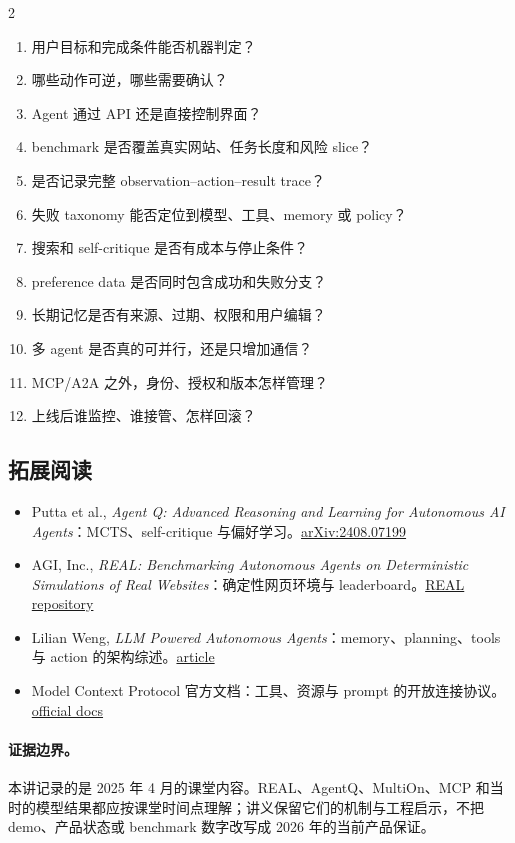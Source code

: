 \documentclass[a4paper]{article}
\begin{document}
\begin{multicols}{2}
\small
\begin{enumerate}
  \item 用户目标和完成条件能否机器判定？
  \item 哪些动作可逆，哪些需要确认？
  \item Agent 通过 API 还是直接控制界面？
  \item benchmark 是否覆盖真实网站、任务长度和风险 slice？
  \item 是否记录完整 observation--action--result trace？
  \item 失败 taxonomy 能否定位到模型、工具、memory 或 policy？
  \item 搜索和 self-critique 是否有成本与停止条件？
  \item preference data 是否同时包含成功和失败分支？
  \item 长期记忆是否有来源、过期、权限和用户编辑？
  \item 多 agent 是否真的可并行，还是只增加通信？
  \item MCP/A2A 之外，身份、授权和版本怎样管理？
  \item 上线后谁监控、谁接管、怎样回滚？
\end{enumerate}
\normalsize
\end{multicols}

\subsection{拓展阅读}

\begin{itemize}
  \item Putta et al., \emph{Agent Q: Advanced Reasoning and Learning for Autonomous AI Agents}：MCTS、self-critique 与偏好学习。\href{https://arxiv.org/abs/2408.07199}{arXiv:2408.07199}
  \item AGI, Inc., \emph{REAL: Benchmarking Autonomous Agents on Deterministic Simulations of Real Websites}：确定性网页环境与 leaderboard。\href{https://github.com/agi-inc/real}{REAL repository}
  \item Lilian Weng, \emph{LLM Powered Autonomous Agents}：memory、planning、tools 与 action 的架构综述。\href{https://lilianweng.github.io/posts/2023-06-23-agent/}{article}
  \item Model Context Protocol 官方文档：工具、资源与 prompt 的开放连接协议。\href{https://modelcontextprotocol.io/}{official docs}
\end{itemize}

\paragraph{证据边界。}
本讲记录的是 2025 年 4 月的课堂内容。REAL、AgentQ、MultiOn、MCP 和当时的模型结果都应按课堂时间点理解；讲义保留它们的机制与工程启示，不把 demo、产品状态或 benchmark 数字改写成 2026 年的当前产品保证。
\end{document}

